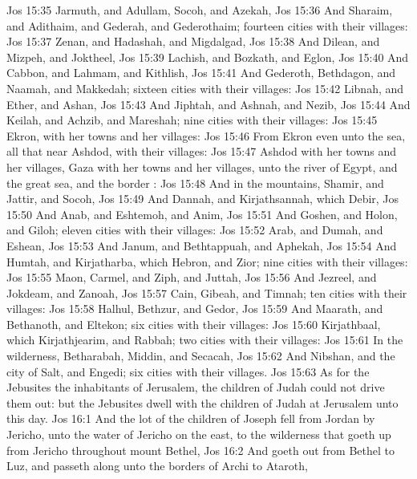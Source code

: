 \vs Jos 15:35 Jarmuth, and Adullam, Socoh, and Azekah,
\vs Jos 15:36 And Sharaim, and Adithaim, and Gederah, and Gederothaim; fourteen cities with their villages:
\vs Jos 15:37 Zenan, and Hadashah, and Migdalgad,
\vs Jos 15:38 And Dilean, and Mizpeh, and Joktheel,
\vs Jos 15:39 Lachish, and Bozkath, and Eglon,
\vs Jos 15:40 And Cabbon, and Lahmam, and Kithlish,
\vs Jos 15:41 And Gederoth, Bethdagon, and Naamah, and Makkedah; sixteen cities with their villages:
\vs Jos 15:42 Libnah, and Ether, and Ashan,
\vs Jos 15:43 And Jiphtah, and Ashnah, and Nezib,
\vs Jos 15:44 And Keilah, and Achzib, and Mareshah; nine cities with their villages:
\vs Jos 15:45 Ekron, with her towns and her villages:
\vs Jos 15:46 From Ekron even unto the sea, all that  near Ashdod, with their villages:
\vs Jos 15:47 Ashdod with her towns and her villages, Gaza with her towns and her villages, unto the river of Egypt, and the great sea, and the border :
\vs Jos 15:48 And in the mountains, Shamir, and Jattir, and Socoh,
\vs Jos 15:49 And Dannah, and Kirjathsannah, which  Debir,
\vs Jos 15:50 And Anab, and Eshtemoh, and Anim,
\vs Jos 15:51 And Goshen, and Holon, and Giloh; eleven cities with their villages:
\vs Jos 15:52 Arab, and Dumah, and Eshean,
\vs Jos 15:53 And Janum, and Bethtappuah, and Aphekah,
\vs Jos 15:54 And Humtah, and Kirjatharba, which  Hebron, and Zior; nine cities with their villages:
\vs Jos 15:55 Maon, Carmel, and Ziph, and Juttah,
\vs Jos 15:56 And Jezreel, and Jokdeam, and Zanoah,
\vs Jos 15:57 Cain, Gibeah, and Timnah; ten cities with their villages:
\vs Jos 15:58 Halhul, Bethzur, and Gedor,
\vs Jos 15:59 And Maarath, and Bethanoth, and Eltekon; six cities with their villages:
\vs Jos 15:60 Kirjathbaal, which  Kirjathjearim, and Rabbah; two cities with their villages:
\vs Jos 15:61 In the wilderness, Betharabah, Middin, and Secacah,
\vs Jos 15:62 And Nibshan, and the city of Salt, and Engedi; six cities with their villages.
\vs Jos 15:63 As for the Jebusites the inhabitants of Jerusalem, the children of Judah could not drive them out: but the Jebusites dwell with the children of Judah at Jerusalem unto this day.
\vs Jos 16:1 And the lot of the children of Joseph fell from Jordan by Jericho, unto the water of Jericho on the east, to the wilderness that goeth up from Jericho throughout mount Bethel,
\vs Jos 16:2 And goeth out from Bethel to Luz, and passeth along unto the borders of Archi to Ataroth,
